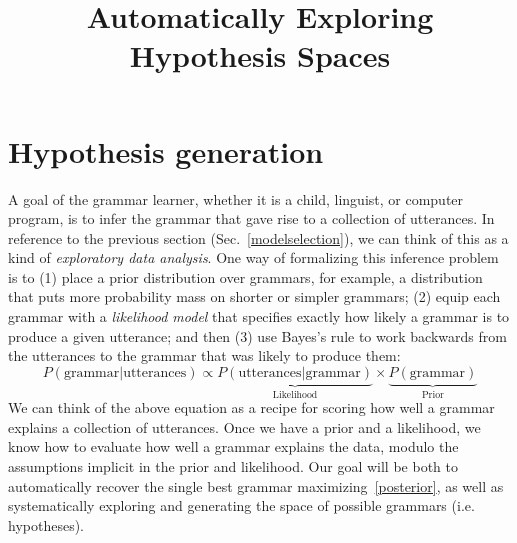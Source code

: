 \documentclass{article}
\title{Automatically Exploring Hypothesis Spaces}
\begin{document}
\maketitle


\section{Hypothesis generation}
\label{althyp}

\newcommand{\probability}[1]{P\left(#1 \right)} %

A goal of the grammar learner, whether it is a child, linguist, or computer program, is to
infer the grammar that gave rise to
a collection of utterances.
In reference to the previous section (Sec.~\ref{modelselection}),
we can think of this as a kind of \emph{exploratory data analysis}.
One way of formalizing
 this inference problem is to (1) place a prior distribution over grammars, for example, a distribution that puts more probability mass on shorter or simpler grammars; (2) equip each grammar with a
\emph{likelihood model} that specifies exactly how likely a grammar is to produce a given utterance;
and then (3) use Bayes's rule to work backwards from the
utterances to the grammar that was likely to produce them:
\begin{equation}
  \probability{\text{grammar}|\text{utterances}}\propto\underbrace{\probability{\text{utterances}|\text{grammar} }}_{\text{Likelihood}}\times\underbrace{\probability{\text{grammar} }}_{\text{Prior}}\label{posterior}
\end{equation}
We can think of the above equation as a recipe for
scoring how well a grammar explains a
collection of utterances.
Once we have a prior and a likelihood,
we know how to evaluate how well a grammar explains the data, modulo the assumptions implicit in the
prior and likelihood.
Our goal will be both to automatically recover the single best grammar maximizing~\ref{posterior},
as well as systematically exploring and generating the space of possible grammars (i.e. hypotheses).
\end{document}
